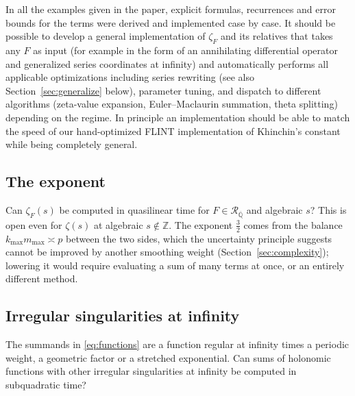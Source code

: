 \documentclass[11pt,reqno]{amsart}
\theoremstyle{definition}
\theoremstyle{remark}
\newcommand{\Qbar}{\overline{\mathbb{Q}}}
\newcommand{\RegQ}{\mathcal{R}_{\Qbar}}
\newcommand{\ZZ}{\mathbb{Z}}
\begin{document}
In all the examples given in the paper, explicit formulas,
recurrences and error bounds for the terms
were derived and implemented case by case.
It should be possible to develop a general implementation of $\zeta_F$ and its relatives
that takes any $F$ as input (for example in the form of an
annihilating differential operator and generalized series coordinates at infinity)
and automatically performs all applicable optimizations
including series rewriting (see also Section~\ref{sec:generalize} below),
parameter tuning, and dispatch to different algorithms
(zeta-value expansion, Euler--Maclaurin summation, theta splitting)
depending on the regime.
In principle an implementation should be able to match the speed of
our hand-optimized FLINT implementation of Khinchin's constant
while being completely general.

\subsection{The exponent}\label{sec:openexp}
Can $\zeta_F(s)$ be computed in quasilinear time for $F \in \RegQ$ and algebraic $s$? This is open even for
$\zeta(s)$ at algebraic $s \notin \ZZ$. The exponent $\frac32$ comes from the balance $k_{\max}m_{\max} \asymp p$
between the two sides, which the uncertainty principle suggests cannot be improved by another smoothing weight
(Section~\ref{sec:complexity}); lowering it would require evaluating a sum of many terms at once, or an entirely
different method.

\subsection{Irregular singularities at infinity}\label{sec:openirreg}
The summands in \eqref{eq:functions} are a function regular at infinity times a periodic weight, a geometric factor or a
stretched exponential. Can sums of holonomic functions with other irregular singularities at infinity be computed in
subquadratic time?
\end{document}
